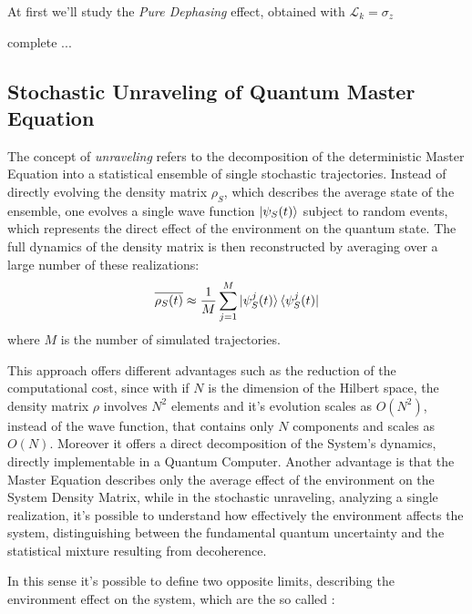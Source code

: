 \documentclass[a4paper,12pt]{article}
\begin{document}
	At first we'll study the \textit{Pure Dephasing} effect, obtained with $ \mathcal{L}_{k} = \sigma_{z} $

	complete ...

	\newpage

	\subsection{Stochastic Unraveling of Quantum Master Equation}
	\label{sub:unraveling}

	The concept of \textit{unraveling} refers to the decomposition of the deterministic Master Equation into a statistical ensemble of single stochastic trajectories. Instead of directly evolving the density matrix $ \rho_{S} $, which describes the average state of the ensemble, one evolves a single wave function $ \ket{\psi_{S}(t)} $ subject to random events, which represents the direct effect of the environment on the quantum state. The full dynamics of the density matrix is then reconstructed by averaging over a large number of these realizations:
	\begin{equation}
		\overline{\rho_{S}(t)} \approx \frac{1}{M} \sum_{j=1}^M \ket{\psi_{S}^{j}(t)}\bra{\psi_{S}^{j}(t)}
		\label{eq:mean_over_traj}
	\end{equation}
	where $M$ is the number of simulated trajectories.

	This approach offers different advantages such as the reduction of the computational cost, since with if $N$ is the dimension of the Hilbert space, the density matrix $\rho$ involves $N^2$ elements and it's evolution scales as $O(N^2)$, instead of the wave function, that contains only $N$ components and scales as $O(N)$. \newline
	Moreover it offers a direct decomposition of the System's dynamics, directly implementable in a Quantum Computer. \newline
	Another advantage is that the Master Equation describes only the average effect of the environment on the System Density Matrix, while in the stochastic unraveling, analyzing a single realization, it's possible to understand how effectively the environment affects the system, distinguishing between the fundamental quantum uncertainty and the statistical mixture resulting from decoherence.

	In this sense it's possible to define two opposite limits, describing the  environment effect on the system, which are the so called :
\end{document}
